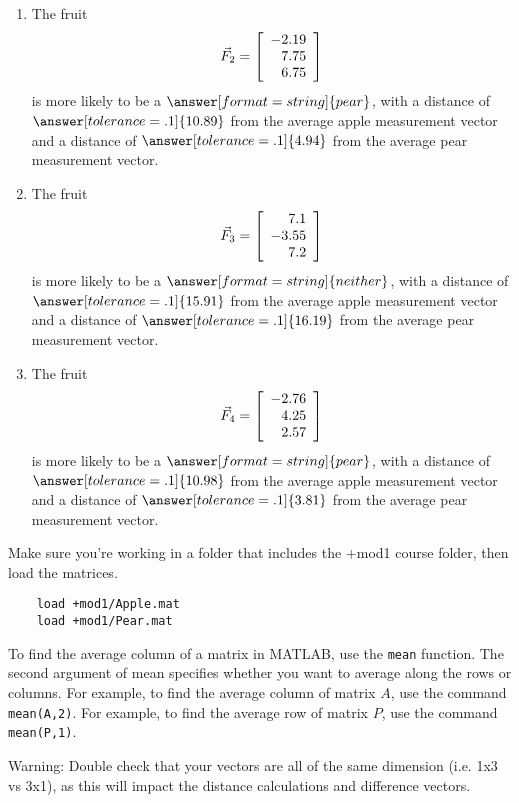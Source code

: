 \documentclass{ximera}
\begin{document}
\begin{problem}
\begin{enumerate}
\item
The fruit
\begin{equation*}
  \vec{F}_2=\startmat{r}
    -2.19 \\
    7.75 \\
    6.75
  \stopmat
\end{equation*}
is more likely to be a $\answer[format=string]{pear}$, with a distance of $\answer[tolerance=.1]{10.89}$ from the average apple measurement vector and a distance of $\answer[tolerance=.1]{4.94}$ from the average pear measurement vector.

\item
The fruit
\begin{equation*}
  \vec{F}_3=\startmat{r}
    7.1 \\
    -3.55 \\
    7.2
  \stopmat
\end{equation*}
is more likely to be a $\answer[format=string]{neither}$, with a distance of $\answer[tolerance=.1]{15.91}$ from the average apple measurement vector and a distance of $\answer[tolerance=.1]{16.19}$ from the average pear measurement vector.

\item
The fruit
\begin{equation*}
  \vec{F}_4=\startmat{r}
    -2.76 \\
    4.25 \\
    2.57
  \stopmat
\end{equation*}
is more likely to be a $\answer[format=string]{pear}$, with a distance of $\answer[tolerance=.1]{10.98}$ from the average apple measurement vector and a distance of $\answer[tolerance=.1]{3.81}$ from the average pear measurement vector.

\end{enumerate}

\begin{hint}

  Make sure you're working in a folder that includes the +mod1 course folder, then load the matrices.
  \begin{verbatim}
    load +mod1/Apple.mat
    load +mod1/Pear.mat
  \end{verbatim}

  To find the average column of a matrix in MATLAB, use the \texttt{mean} function. The second argument of mean specifies whether you want to average along the rows or columns. For example, to find the average column of matrix $A$, use the command \texttt{mean(A,2)}. For example, to find the average row of matrix $P$, use the command \texttt{mean(P,1)}.

  Warning: Double check that your vectors are all of the same dimension (i.e. 1x3 vs 3x1), as this will impact the distance calculations and difference vectors.

\end{hint}

  
\end{problem}
\end{document}

